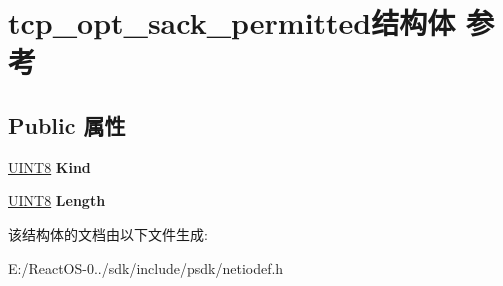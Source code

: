\hypertarget{structtcp__opt__sack__permitted}{}\section{tcp\+\_\+opt\+\_\+sack\+\_\+permitted结构体 参考}
\label{structtcp__opt__sack__permitted}
\subsection*{Public 属性}
\begin{DoxyCompactItemize}
\item 
\mbox{\label{structtcp__opt__sack__permitted_a12b48e5343745f60ddff789adfbfb8d0}} 
\hyperlink{_processor_bind_8h_ab27e9918b538ce9d8ca692479b375b6a}{U\+I\+N\+T8} {\bfseries Kind}
\item 
\mbox{\label{structtcp__opt__sack__permitted_a06f85862072053b62f15814beb1020a3}} 
\hyperlink{_processor_bind_8h_ab27e9918b538ce9d8ca692479b375b6a}{U\+I\+N\+T8} {\bfseries Length}
\end{DoxyCompactItemize}


该结构体的文档由以下文件生成\+:\begin{DoxyCompactItemize}
\item 
E\+:/\+React\+O\+S-\/0../sdk/include/psdk/netiodef.\+h\end{DoxyCompactItemize}
